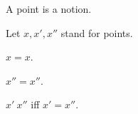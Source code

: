\begin{forthel}

    \begin{signature}
        A point is a notion.
    \end{signature}

    Let $x, x', x''$ stand for points.

    \begin{axiom}
        $x = x$.
    \end{axiom}

    \begin{axiom}
        $x'' = x''$.
    \end{axiom}

    \begin{definition}
        $x' ~  x''$ iff $x' = x''$.
    \end{definition}
\end{forthel}
